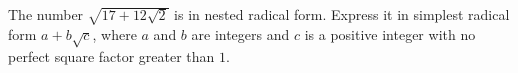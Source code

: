 The number $\sqrt{17+12\sqrt2}$ is in nested radical form. Express it in simplest radical form $a+b\sqrt c$, where $a$ and $b$ are integers and $c$ is a positive integer with no perfect square factor greater than $1$.

